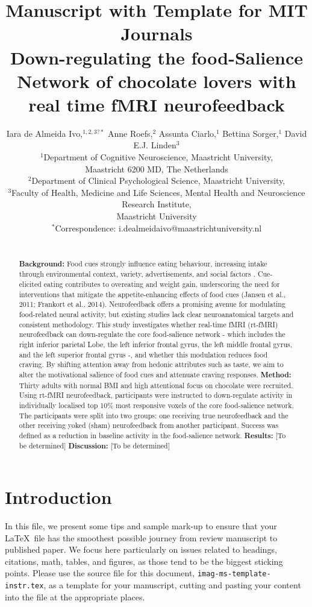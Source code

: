 \documentclass[]{imag-ms-template}
\title{Manuscript with Template for MIT Journals \\Down-regulating the food-Salience Network of chocolate lovers with real time fMRI neurofeedback}
\author{Iara de Almeida Ivo,$^{1,2,3?\ast}$ Anne Roefs,$^{2}$ Assunta Ciarlo,$^{1}$ Bettina Sorger,$^{1}$ David E.J. Linden$^{3}$\\
{\small $^{1}$Department of Cognitive Neuroscience, Maastricht University,}\\
{\small Maastricht 6200 MD, The Netherlands}\\
{\small $^{2}$Department of Clinical Psychological Science, Maastricht University,}\\
{\small $^{3}$Faculty of Health, Medicine and Life Sciences, Mental Health and Neuroscience Research Institute,\\ Maastricht University}\\
{\small $^\ast$Correspondence:  i.dealmeidaivo@maastrichtuniversity.nl}
}
\begin{document}
 

\maketitle 



\begin{abstract}
  \\\textbf{Background:} Food cues strongly influence eating behaviour, increasing intake through environmental context, variety, advertisements, and social factors \cite{Boggiano et al., 2009; Guerrieri et al., 2008; Remick et al., 2009; Harris et al., 2009; Herman et al., 2003, 2012}. Cue-elicited eating contributes to overeating and weight gain, underscoring the need for interventions that mitigate the appetite-enhancing effects of food cues (Jansen et al., 2011; Frankort et al., 2014). Neurofeedback offers a promising avenue for modulating food-related neural activity, but existing studies lack clear neuroanatomical targets and consistent methodology. This study investigates whether real-time fMRI (rt-fMRI) neurofeedback can down-regulate the core food-salience network - which includes the right inferior parietal Lobe, the left inferior frontal gyrus, the left middle frontal gyrus, and the left superior frontal gyrus -, and whether this modulation reduces food craving. By shifting attention away from hedonic attributes such as taste, we aim to alter the motivational salience of food cues and attenuate craving responses. \textbf{Method:} Thirty adults with normal BMI and high attentional focus on chocolate were recruited. Using rt-fMRI neurofeedback, participants were instructed to down-regulate activity in individually localised top 10\% most responsive voxels of the core food-salience network. The participants were split into two groups: one receiving true neurofeedback and the other receiving yoked (sham) neurofeedback from another participant. Success was defined as a reduction in baseline activity in the food-salience network.
  \textbf{Results:} [To be determined] \textbf{Discussion:} [To be determined]
\end{abstract}

\section{Introduction}

In this file, we present some tips and sample mark-up to ensure that your
\LaTeX\ file has the smoothest possible journey from review manuscript
to published paper.  We focus here particularly on
issues related to headings, citations, math, tables, and
figures, as those tend to be the biggest sticking points.  Please use
the source file for this document, \texttt{imag-ms-template-instr.tex}, as a template
for your manuscript, cutting and pasting your content into the file at
the appropriate places.
\end{document}
